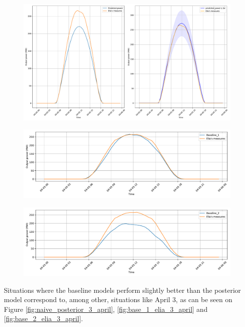 \documentclass[a4paper, 12pt]{article}
\begin{document}
\begin{figure}[H]
    \centering
    \includegraphics[width=\textwidth]{resources/pdf/comparison_naive_posterior (29-03-2020).pdf}
    \label{fig:naive_posterior_5_april}
\end{figure}
\begin{figure}[H]
    \centering
    \includegraphics[width=\textwidth]{resources/pdf/baseline_1 (29-03-2020).pdf}
    \label{fig:base_1_elia_5_april}
\end{figure}
\begin{figure}[H]
    \centering
    \includegraphics[width=\textwidth]{resources/pdf/baseline_2 (29-03-2020).pdf}
    \label{fig:base_2_elia_5_april}
\end{figure}
Situations where the baseline models perform slightly better than the posterior model correspond to, among other, situations like April 3, as can be seen on Figure \ref{fig:naive_posterior_3_april}, \ref{fig:base_1_elia_3_april} and \ref{fig:base_2_elia_3_april}.
\end{document}
